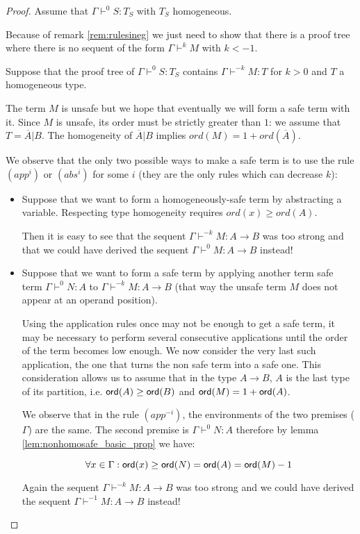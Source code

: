 \begin{proof}
Assume that $\Gamma \vdash^{0} S : T_S$ with $T_S$ homogeneous.


Because of remark \ref{rem:rulesineg} we just need to show that
there is a proof tree where there is no sequent of the form $\Gamma
\vdash^{k} M$ with $k<-1$.

Suppose that the proof tree of $\Gamma \vdash^{0} S : T_S$ contains
$\Gamma \vdash^{-k} M : T$ for $k>0$ and $T$ a homogeneous type.

The term $M$ is unsafe but we hope that eventually we will form a
safe term with it. Since $M$ is unsafe, its order must be strictly
greater than $1$: we assume that $T = \overline{A} | B$. The
homogeneity of $\overline{A} | B$ implies $ord(M) = 1 +
ord(\overline{A})$.

We observe that the only two possible ways to make a safe term is to
use the rule $(app^i)$ or $(abs^i)$ for some $i$ (they are the only
rules which can decrease $k$):

\begin{itemize}
\item
 Suppose that we want to form a homogeneously-safe term by abstracting a variable. Respecting type homogeneity
 requires $ord(x) \geq ord(A)$.

Then it is easy to see that the sequent $\Gamma \vdash^{-k} M : A
\rightarrow B$ was too strong and that we could have derived the
sequent $\Gamma \vdash^0 M : A \rightarrow B$ instead!

\item
Suppose that we want to form a safe term by applying another term
safe term $\Gamma \vdash^0 N : A$ to $\Gamma \vdash^{-k} M : A
\rightarrow B$ (that way the unsafe term $M$ does not appear at an
operand position).

Using the application rules once may not be enough to get a safe
term, it may be necessary to perform several consecutive
applications until the order of the term becomes low enough. We now
consider the very last such application, the one that turns the non
safe term into a safe one. This consideration allows us to assume
that in the type $A \rightarrow B$, $A$ is the last type of its
partition, i.e. ${\sf ord}(A) \geq {\sf ord}(B)$ and ${\sf ord}(M) = 1 + {\sf ord}(A)$.

We observe that in the rule $(app^{-i})$, the environments  of the
two premises ($\Gamma$) are the same. The second premise is $\Gamma
\vdash^{0} N : A$ therefore by lemma
\ref{lem:nonhomosafe_basic_prop} we have:

\begin{equation}
\forall x \in \Gamma : {\sf ord}(x) \geq {\sf ord}(N) = {\sf ord}(A) = {\sf ord}(M) - 1
\end{equation}

Again the sequent $\Gamma \vdash^{-k} M : A \rightarrow B$ was too
strong and we could have derived the sequent $\Gamma \vdash^{-1} M :
A \rightarrow B$ instead!

\end{itemize}
\end{proof}

